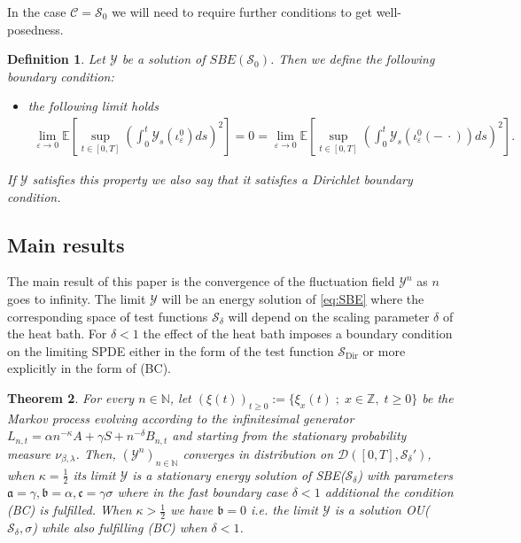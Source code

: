 \documentclass[a4paper, reqno, 12pt]{amsart}
\theoremstyle{plain}
\newtheorem{definition}{Definition}[section]
\newtheorem{theorem}[definition]{Theorem}
\theoremstyle{definition}
\newcommand{\N}{\mathbb{N}}
\newcommand{\Sdir}{\mathcal{S}_{\text{Dir}}}
\begin{document}
In the case $\mathcal C = \mathcal S_0$ we will need to require further conditions to get well-posedness.
\begin{definition}
\label{def:extradirichlet}
    Let $\mathcal Y$ be a solution of $SBE(\mathcal S_0)$. Then we define the following boundary condition:
\begin{itemize}
    \item[(BC)] the following limit holds 
    \begin{align*}
        \lim_{\varepsilon \to 0} \mathbb E\left[\sup_{t\in[0,T]}\left( \int_0^t \mathcal Y_s(\iota^0_{\varepsilon}) ds \right)^2\right] =
        0 = \lim_{\varepsilon \to 0} \mathbb E\left[\sup_{t\in[0,T]}\left( \int_0^t \mathcal Y_s(\iota^0_{\varepsilon}(-\ \cdot)) ds \right)^2\right] .
    \end{align*}
\end{itemize}
If $\mathcal Y$ satisfies this property we also say that it satisfies a Dirichlet boundary condition.
\end{definition}




\subsection{Main results}
The main result of this paper is the convergence of the fluctuation field $\mathcal Y^n$ as $n$ goes to infinity. The limit $\mathcal Y$ will be an energy solution of \eqref{eq:SBE} where the corresponding space of test functions $\mathcal S_{\delta}$  will depend on the scaling parameter $\delta$ of the heat bath. 
For $\delta <1$ the effect of the heat bath imposes a boundary condition on the limiting SPDE either in the form of the test function $\Sdir$ or more explicitly in the form of (BC).


\begin{theorem} 
\label{thm:mainresult}
    For every $n\in\N$, let $(\xi(t))_{t \ge 0}:=\{\xi_x (t) \; ; \; x\in\mathbb Z, \; t\ge 0\}$ be the Markov process evolving according to the infinitesimal generator $L_{n,t} = \alpha n^{-\kappa} A+\gamma S+n^{-\delta}B_{n,t}$ and starting from the stationary probability measure $\nu_{\beta,\lambda}$. Then,  $(\mathcal Y^n)_{n\in\mathbb N}$ converges in distribution on $\mathcal D([0,T],\mathcal S_{\delta}')$, when $\kappa = \tfrac{1}{2}$ its limit $\mathcal Y$ is a stationary energy solution of SBE($\mathcal S_{\delta}$) with parameters $\mathfrak a= \gamma, \mathfrak b = \alpha, \mathfrak c = \gamma\sigma$ where in the fast boundary case $\delta < 1$ additional the condition (BC) is fulfilled. When $\kappa>\tfrac{1}{2}$ we have $\mathfrak b =0$ i.e. the limit $\mathcal Y$ is a solution OU($\mathcal S_{\delta},\sigma$) while also fulfilling (BC) when $\delta< 1$.  
\end{theorem}
\end{document}
